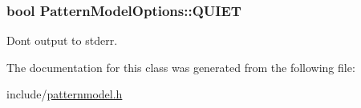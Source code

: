 \subsubsection[{Q\+U\+I\+E\+T}]{\setlength{\rightskip}{0pt plus 5cm}bool Pattern\+Model\+Options\+::\+Q\+U\+I\+E\+T}\label{classPatternModelOptions_ad99d007239e6ef18a6fd8ce51fb9d1bd}


Don\textquotesingle{}t output to stderr. 



The documentation for this class was generated from the following file\+:\begin{DoxyCompactItemize}
\item 
include/\hyperlink{patternmodel_8h}{patternmodel.\+h}\end{DoxyCompactItemize}
